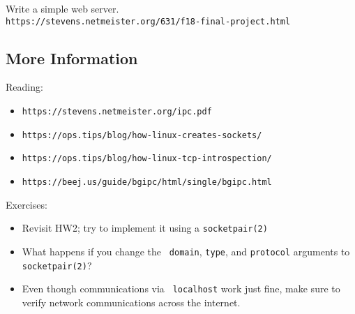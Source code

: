 \documentclass[xga]{xdvislides}
\begin{document}
Write a simple web server. \\
\verb+https://stevens.netmeister.org/631/f18-final-project.html+

\subsection{More Information}
Reading:
\begin{itemize}
	\item \verb+https://stevens.netmeister.org/ipc.pdf+
	\item \verb+https://ops.tips/blog/how-linux-creates-sockets/+
	\item \verb+https://ops.tips/blog/how-linux-tcp-introspection/+
	\item \verb+https://beej.us/guide/bgipc/html/single/bgipc.html+
\end{itemize}
\vspace{.5in}


Exercises:
\begin{itemize}
	\item Revisit HW2; try to implement it using a
		{\tt socketpair(2)}
	\item What happens if you change the {\tt
domain}, {\tt type}, and {\tt protocol} arguments to
{\tt socketpair(2)}?
	\item Even though communications via {\tt
localhost} work just fine, make sure to verify network
communications across the internet.
\end{itemize}
\end{document}
